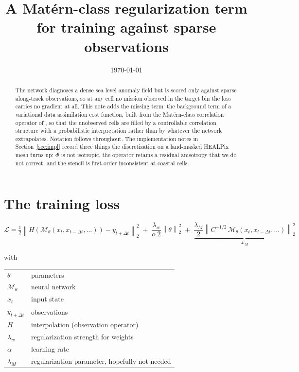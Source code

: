\documentclass[11pt]{article}
\title{A Mat\'ern-class regularization term for training against sparse observations}
\date{\today}
\newcommand{\Mnet}{\mathcal{M}_\theta}
\begin{document}
\maketitle

\begin{abstract}
\noindent
The network diagnoses a dense sea level anomaly field but is scored only against sparse
along-track observations, so at any cell no mission observed in the target bin the loss
carries no gradient at all. This note adds the missing term: the background term of a
variational data assimilation cost function, built from the Mat\'ern-class correlation
operator of \citet{smith2022}, so that the unobserved cells are filled by a controllable
correlation structure with a probabilistic interpretation rather than by whatever the
network extrapolates. Notation follows \citet{smith2022} throughout. The implementation
notes in Section~\ref{sec:impl} record three things the discretization on a land-masked
HEALPix mesh turns up: $\Phi$ is not isotropic, the operator retains a residual
anisotropy that we do not correct, and the stencil is first-order inconsistent at
coastal cells.
\end{abstract}

\section{The training loss}

\begin{equation}
\label{eq:loss}
\mathcal{L} =
\tfrac{1}{2}\left\| H\!\left(\Mnet(x_t, x_{t-\Delta t}, \ldots)\right) - y_{t+\Delta t}\right\|_2^2
\;+\; \frac{\lambda_w}{\alpha\,2}\left\|\theta\right\|_2^2
\;+\; \underbrace{\frac{\lambda_M}{2}\left\| C^{-1/2}\,\Mnet(x_t, x_{t-\Delta t}, \ldots)\right\|_2^2}_{\displaystyle \mathcal{L}_M}
\end{equation}

\noindent with

\begin{center}
\begin{tabular}{ll}
\toprule
$\theta$ & parameters \\
$\Mnet$ & neural network \\
$x_t$ & input state \\
$y_{t+\Delta t}$ & observations \\
$H$ & interpolation (observation operator) \\
$\lambda_w$ & regularization strength for weights \\
$\alpha$ & learning rate \\
$\lambda_M$ & regularization parameter, hopefully not needed \\
\bottomrule
\end{tabular}
\end{center}
\end{document}
